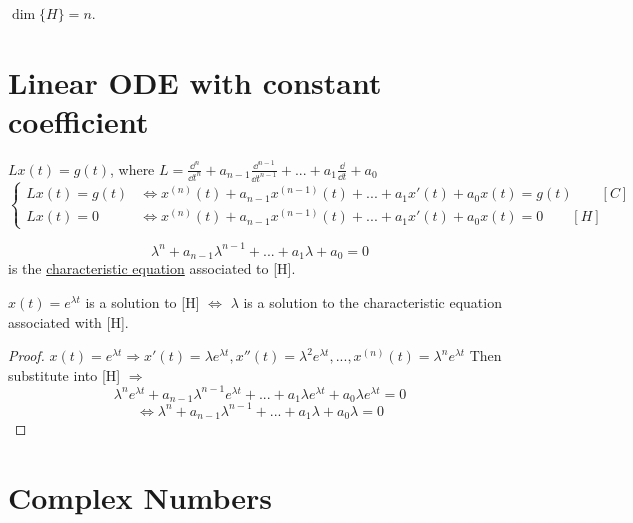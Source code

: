 \documentclass[twoside]{article}
\begin{document}
\begin{corollary}
    $\dim \{H\} = n$.
\end{corollary}

\section{Linear ODE with constant coefficient}
$Lx(t) = g(t)$, where $
{L} = \frac{\dd^n }{\dd t^n}+ a_{n-1}\frac{\dd^{n-1} }{\dd t^{n-1}} + ... + a_1\frac{\dd }{\dd t}+ a_0$
\begin{equation}
    \begin{cases}
        Lx(t) = g(t) &\iff  x^{(n)}(t)+ a_{n-1}x^{(n-1)}(t) + ... + a_1 x'(t) + a_0 x(t) = g(t) \qquad [C]\\
        Lx(t) = 0    &\iff  x^{(n)}(t)+ a_{n-1}x^{(n-1)}(t) + ... + a_1 x'(t) + a_0 x(t)  = 0 \qquad [H]
    \end{cases}
\end{equation}

\begin{definition}
    \begin{equation}
        \lambda^n + a_{n-1} \lambda^{n-1} + ... + a_1 \lambda + a_0 = 0
    \end{equation}
    is the \underline{characteristic equation} associated to [H].
\end{definition}

\begin{theorem}
    $x(t) = e^{\lambda t}$ is a solution to [H] $\iff$ $\lambda$ is a solution to the characteristic equation associated with [H].
\end{theorem}
\begin{proof}
    $x(t) = e^{\lambda t} \Longrightarrow x'(t) = \lambda e^{\lambda t}, x''(t) = \lambda^2 e^{\lambda t}, ..., x^{(n)}(t) = \lambda^n e^{\lambda t}$
    Then substitute into [H] $\Longrightarrow$
    \begin{equation}
        \lambda^{n}e^{\lambda t}+ a_{n-1}\lambda^{n-1}e^{\lambda t} + ... + a_1 \lambda e^{\lambda t} + a_0 \lambda e^{\lambda t}  = 0
    \end{equation}
    \begin{equation}
        \iff \lambda^{n}+ a_{n-1}\lambda^{n-1} + ... + a_1 \lambda  + a_0 \lambda   = 0
    \end{equation}
\end{proof}

\section{Complex Numbers} 
\end{document}
